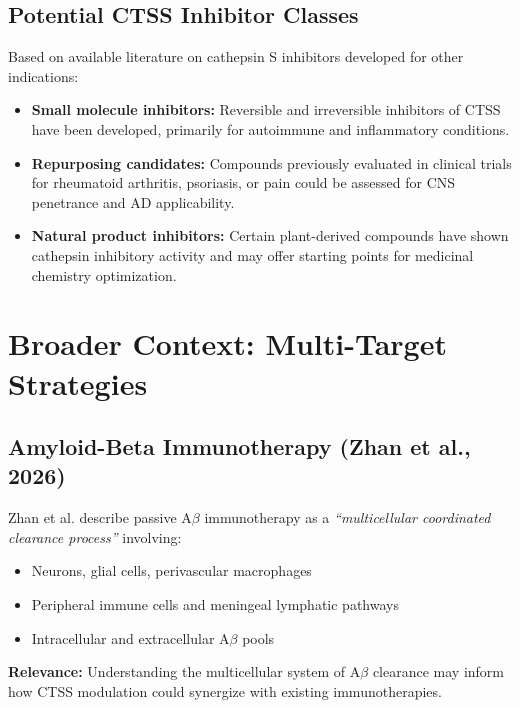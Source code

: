 \documentclass[11pt, a4paper]{article}
\begin{document}
\subsection{Potential CTSS Inhibitor Classes}

Based on available literature on cathepsin S inhibitors developed for other indications:

\begin{itemize}
    \item \textbf{Small molecule inhibitors:} Reversible and irreversible inhibitors of CTSS have been developed, primarily for autoimmune and inflammatory conditions.
    \item \textbf{Repurposing candidates:} Compounds previously evaluated in clinical trials for rheumatoid arthritis, psoriasis, or pain could be assessed for CNS penetrance and AD applicability.
    \item \textbf{Natural product inhibitors:} Certain plant-derived compounds have shown cathepsin inhibitory activity and may offer starting points for medicinal chemistry optimization.
\end{itemize}

\section{Broader Context: Multi-Target Strategies}

\subsection{Amyloid-Beta Immunotherapy (Zhan et al., 2026)}

Zhan et al. describe passive A$\beta$ immunotherapy as a \textit{``multicellular coordinated clearance process''} involving:
\begin{itemize}
    \item Neurons, glial cells, perivascular macrophages
    \item Peripheral immune cells and meningeal lymphatic pathways
    \item Intracellular and extracellular A$\beta$ pools
\end{itemize}

\textbf{Relevance:} Understanding the multicellular system of A$\beta$ clearance may inform how CTSS modulation could synergize with existing immunotherapies.
\end{document}

